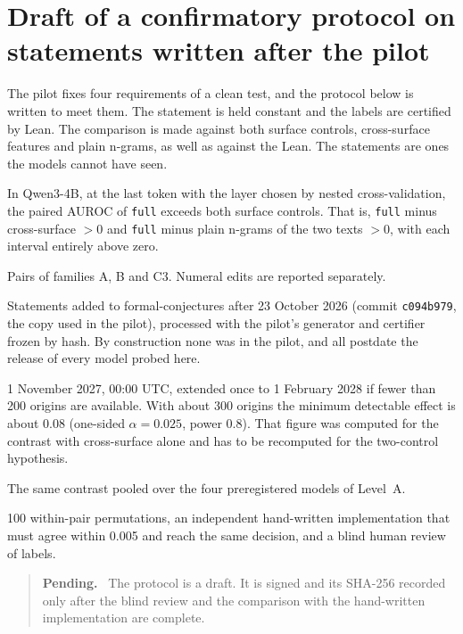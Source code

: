 \documentclass[10pt]{article}
\newcommand{\vr}[1]{\texttt{#1}}
\newenvironment{pendiente}{\begin{quote}\small\noindent\textbf{Pending.}\ }{\end{quote}}
\begin{document}
\section{Draft of a confirmatory protocol on statements written after the pilot}\label{app:protocolo}

The pilot fixes four requirements of a clean test, and the protocol below is written to meet them. The statement is
held constant and the labels are certified by Lean. The comparison is made against both surface controls,
cross-surface features and plain n-grams, as well as against the Lean. The statements are ones the models cannot
have seen.

\begin{description}[leftmargin=1.2em]
\item[Hypothesis] In Qwen3-4B, at the last token with the layer chosen by nested cross-validation, the paired
AUROC of \vr{full} exceeds both surface controls. That is, \vr{full} minus cross-surface $> 0$ and \vr{full} minus
plain n-grams of the two texts $> 0$, with each interval entirely above zero.
\item[Population] Pairs of families A, B and C3. Numeral edits are reported separately.
\item[Data] Statements added to formal-conjectures after 23 October 2026 (commit \vr{c094b979}, the copy used in the pilot),
processed with the pilot's generator and certifier frozen by hash. By construction none was in the pilot, and all
postdate the release of every model probed here.
\item[Snapshot] 1 November 2027, 00:00 UTC, extended once to 1 February 2028 if fewer than 200 origins are
available. With about 300 origins the minimum detectable effect is about 0.08 (one-sided $\alpha = 0.025$, power
0.8). That figure was computed for the contrast with cross-surface alone and has to be recomputed for the
two-control hypothesis.
\item[Replication] The same contrast pooled over the four preregistered models of Level~A.
\item[Checks] 100 within-pair permutations, an independent hand-written implementation that must agree within
0.005 and reach the same decision, and a blind human review of labels.
\end{description}

\begin{pendiente}
The protocol is a draft. It is signed and its SHA-256 recorded only after the blind review and the comparison with
the hand-written implementation are complete.
\end{pendiente}

\end{document}
